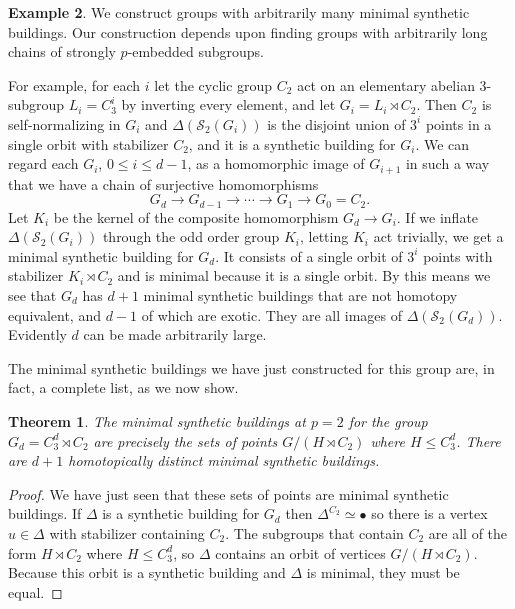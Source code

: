 \documentclass[12pt]{amsart}
\theoremstyle{plain}
\newtheorem{theorem}{Theorem}[section]
\theoremstyle{definition}
\newtheorem{example}[theorem]{Example}
\theoremstyle{remark}
\numberwithin{equation}{section}
\newcommand{\SpCpx}[2]{\Delta(\mathcal{S}_{#2}(#1))}
\begin{document}
\begin{example}
\label{arbitrary-minimal-example}
We construct groups with arbitrarily many minimal synthetic buildings. Our construction depends upon finding  groups with arbitrarily long chains of strongly $p$-embedded subgroups. 

For example, for each $i$ let the cyclic group $C_2$ act on an elementary abelian $3$-subgroup $L_i=C_3^i$ by inverting every element, and let $G_i=L_i\rtimes C_2$. Then $C_2$ is self-normalizing in $G_i$ and $\SpCpx{G_i}{2}$ is the disjoint union of $3^i$ points in a single orbit with stabilizer $C_2$, and it is a synthetic building for $G_i$. We can regard each $G_i$, $0\le i\le d-1$, as a homomorphic image of $G_{i+1}$ in such a way that we have a chain of surjective homomorphisms
    $$
    G_d\to G_{d-1}\to \cdots\to G_1\to G_0 = C_2.
    $$
Let $K_i$ be the kernel of the composite homomorphism $G_d\to G_i$. If we inflate $\SpCpx{G_i}{2}$ through the odd order group $K_i$, letting $K_i$ act trivially, we get a minimal synthetic building for $G_d$. It consists of a single orbit of $3^i$ points with stabilizer $K_i\rtimes C_2$ and is minimal because it is a single orbit. By this means we see that $G_d$ has $d+1$ minimal synthetic buildings that are not homotopy equivalent, and $d-1$ of which are exotic. They are all images of $\SpCpx{G_d}{2}$. Evidently $d$ can be made arbitrarily large.

The minimal synthetic buildings we have just constructed for this group are, in fact,  a complete list, as we now show.

    \begin{theorem}
        The minimal synthetic buildings at $p=2$ for the group $G_d=C_3^d\rtimes C_2$ are precisely the sets of points $G/(H\rtimes C_2)$ where $H\le C_3^d$. There are $d+1$ homotopically distinct minimal synthetic buildings.
    \end{theorem}

\begin{proof}
    We have just seen that these sets of points are minimal synthetic buildings. If $\Delta$ is a synthetic building for $G_d$ then $\Delta^{C_2}\simeq \bullet$ so there is a vertex $u\in\Delta$ with stabilizer containing $C_2$. The subgroups that contain $C_2$ are all of the form $H\rtimes C_2$ where $H\le C_3^d$, so $\Delta$ contains an orbit of vertices $G/(H\rtimes C_2)$. Because this orbit is a synthetic building and $\Delta$ is minimal, they must be equal.
\end{proof}
\end{example} 
\end{document}
